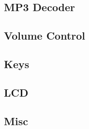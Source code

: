 \documentclass[12pt,a4paper,titlepage,oneside]{article}
\begin{document}
{






\subsection{MP3 Decoder}






\subsection{Volume Control}




\subsection{Keys}




\subsection{LCD}






\subsection{Misc}







}%


 
\end{document}
